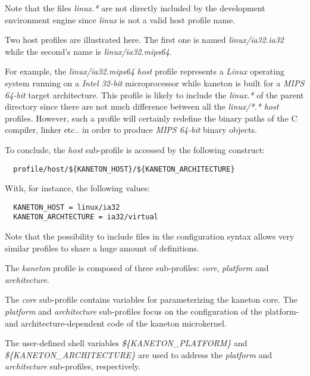 Note that the files \textit{linux.*} are not directly included by the
development environment engine since \textit{linux} is not a valid host
profile name.

Two host profiles are illustrated here. The first one is named
\textit{linux/ia32.ia32} while the second's name is \textit{linux/ia32.mips64}.

For example, the \textit{linux/ia32.mips64} \textit{host} profile represents a
\textit{Linux} operating system running on a \textit{Intel 32-bit}
microprocessor while kaneton is built for a \textit{MIPS 64-bit} target
architecture. This profile is likely to include the \textit{linux.*} of the
parent directory since there are not much difference between all the
\textit{linux/*.*} \textit{host} profiles. However, such a profile will
certainly redefine the binary paths of the C compiler, linker etc.. in order
to produce \textit{MIPS 64-bit} binary objects.

To conclude, the \textit{host} sub-profile is accessed by the following
construct:

\begin{verbatim}
  profile/host/${KANETON_HOST}/${KANETON_ARCHITECTURE}
\end{verbatim}

With, for instance, the following values:

\begin{verbatim}
  KANETON_HOST = linux/ia32
  KANETON_ARCHTECTURE = ia32/virtual
\end{verbatim}

Note that the possibility to include files in the configuration syntax allows
very similar profiles to share a huge amount of definitions.



The \textit{kaneton} profile is composed of three sub-profiles: \textit{core},
\textit{platform} and \textit{architecture}.

The \textit{core} sub-profile contains variables for parameterizing the
kaneton core. The \textit{platform} and \textit{architecture} sub-profiles
focus on the configuration of the platform- and architecture-dependent code
of the kaneton microkernel.

The user-defined shell variables \textit{\$\{KANETON\_PLATFORM\}} and
\textit{\$\{KANETON\_ARCHITECTURE\}} are used to address the \textit{platform}
and \textit{architecture} sub-profiles, respectively.

